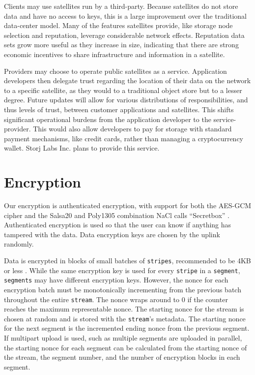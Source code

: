 \documentclass[11pt,fleqn,openany]{book}
\newcommand{\x}[1]{{\tt #1}} \newcommand{\code}[1]{{\em #1}}
\begin{document}
Clients may use satellites run by a third-party. Because satellites do not store
data and have no access to keys, this is a large improvement over the
traditional data-center model. Many of the features satellites provide, like
storage node selection and reputation, leverage considerable network effects.
Reputation data sets grow more useful as they increase in size,
indicating that there are strong economic incentives to share infrastructure
and information in a satellite.

Providers may choose to operate public satellites as a service.
Application developers then delegate trust regarding the location of their
data on the network to a specific satellite, as they
would to a traditional object store but to a lesser degree. Future updates
will allow for various distributions of responsibilities, and thus levels of
trust, between customer applications and satellites. This shifts significant
operational burdens from the application developer to the service-provider.
This would also allow developers to pay for storage with standard payment
mechanisms, like credit cards, rather than managing a cryptocurrency wallet.
Storj Labs Inc. plans to provide this service.

\section{Encryption}\label{sec:concrete-encryption}

Our encryption is authenticated encryption, with support for both the
AES-GCM cipher and the Salsa20 and Poly1305 combination NaCl calls ``Secretbox''
\cite{nacl-crypto}. Authenticated encryption is used so that the user can know
if anything has tampered with the data. Data encryption keys are chosen by the
uplink randomly.

Data is encrypted in blocks of small batches of \x{stripes}, recommended to be
4KB or less \cite{nacl-packetlen}. While the same encryption key is used for
every \x{stripe} in a \x{segment}, \x{segments} may have
different encryption keys. However, the nonce for each encryption
batch must be monotonically incrementing from the previous batch throughout the
entire \x{stream}. The nonce wraps around to 0 if the counter reaches the
maximum representable nonce. The starting nonce for the stream is chosen at
random and is stored with the \x{stream}'s metadata.
The starting nonce for the next segment
is the incremented ending nonce from the previous segment. If multipart upload
is used, such as multiple segments are uploaded in parallel, the starting nonce
for each segment can be calculated from the starting nonce of the stream, the
segment number, and the number of encryption blocks in each segment.
\end{document}
